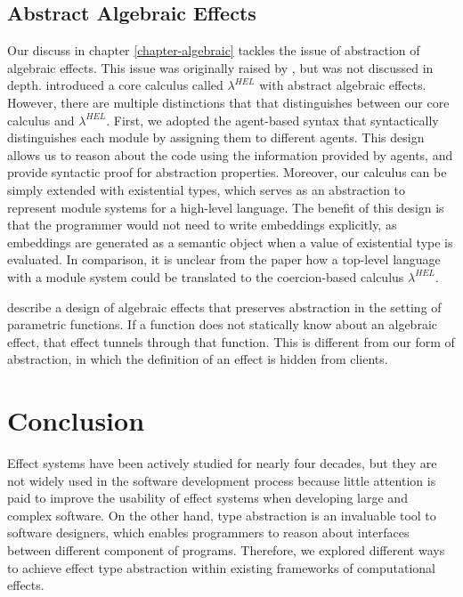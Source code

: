 \subsection{Abstract Algebraic Effects}
\label{related-abstract}
Our discuss in chapter \ref{chapter-algebraic} tackles the issue of abstraction of algebraic effects. This issue was originally raised by \citet{leijen18}, but was not discussed in depth. \citet{biernacki19} introduced a core calculus called $\lambda^{HEL}$ with abstract algebraic effects. However, there are multiple distinctions that that distinguishes between our core calculus and $\lambda^{HEL}$. First, we adopted the agent-based syntax that syntactically distinguishes each module by assigning them to different agents. This design allows us to reason about the code using the information provided by agents, and provide syntactic proof for abstraction properties. Moreover, our calculus can be simply extended with existential types, which serves as an abstraction to represent module systems for a high-level language. The benefit of this design is that the programmer would not need to write embeddings explicitly, as embeddings are generated as a semantic object when a value of existential type is evaluated. In comparison, it is unclear from the paper \cite{biernacki19} how a top-level language with a module system could be translated to the coercion-based calculus $\lambda^{HEL}$.

\citet{Zhang19} describe a design of algebraic effects that preserves abstraction in the setting of parametric functions. If a function does not statically know about an algebraic effect, that effect tunnels through that function.  This is different from our form of abstraction, in which the definition of an effect is hidden from clients.


\section{Conclusion}

Effect systems have been actively studied for nearly four decades, but they are not widely used in the software development process because little attention is paid to improve the usability of effect systems when developing large and complex software. On the other hand, type abstraction is an invaluable tool to software designers, which enables programmers to reason about interfaces between different component of programs. Therefore, we explored different ways to achieve effect type abstraction within existing frameworks of computational effects.

